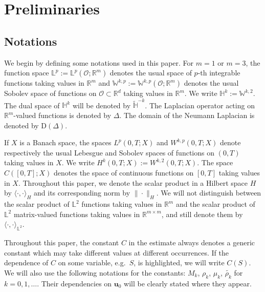 \documentclass[11pt, reqno]{amsart}
\theoremstyle{definition}
\numberwithin{equation}{section}
\newcommand{\bff}{\boldsymbol}
\newcommand{\bb}{\mathbb}
\begin{document}
\section{Preliminaries}\label{sec:prelim}

\subsection{Notations}
We begin by defining some notations used in this paper. For $m=1$ or $m=3$, the function space $\bb{L}^p := \bb{L}^p(\mathscr{O}; \bb{R}^m)$ denotes the usual space of $p$-th integrable functions taking values in $\bb{R}^m$ and $\bb{W}^{k,p} := \bb{W}^{k,p}(\mathscr{O}; \bb{R}^m)$ denotes the usual Sobolev space of 
functions on $\mathscr{O} \subset \bb{R}^d$ taking values in $\bb{R}^m$. We
write $\bb{H}^k := \bb{W}^{k,2}$. The dual space of $\bb{H}^k$ will be denoted by $\widetilde{\bb{H}}^{-k}$. The Laplacian operator acting on $\bb{R}^m$-valued functions is denoted by $\Delta$. The domain of the Neumann Laplacian is denoted by $\mathrm{D}(\Delta)$.

If $X$ is a Banach space, the spaces $L^p(0,T; X)$ and $W^{k,p}(0,T;X)$ denote respectively the usual Lebesgue and Sobolev spaces of functions on $(0,T)$ taking values in $X$. We write $H^k(0,T;X):=W^{k,2}(0,T;X)$. The space $C([0,T];X)$ denotes the space of continuous functions on $[0,T]$ taking values in $X$. Throughout this paper, we denote the scalar product in a Hilbert space $H$ by $\langle \cdot, \cdot\rangle_H$ and its corresponding norm by $\|\cdot\|_H$. We will not distinguish between the scalar product of $\bb{L}^2$ functions taking values in $\bb{R}^m$ and the scalar product of $\bb{L}^2$ matrix-valued functions taking values in $\bb{R}^{m\times m}$, and still denote them by $\langle\cdot,\cdot\rangle_{\bb{L}^2}$.

Throughout this paper, the constant $C$ in the estimate always denotes a
generic constant which may take different values at different occurrences. If the dependence of $C$ on some variable, e.g.~$S$, is highlighted, we will write
$C(S)$. We will also use the following notations for the constants: $M_k$, $\rho_k$, $\mu_k$, $\widetilde{\rho_k}$ for $k=0,1,\ldots$. Their dependencies on $\bff{u}_0$ will be clearly stated where they appear.
\end{document}
